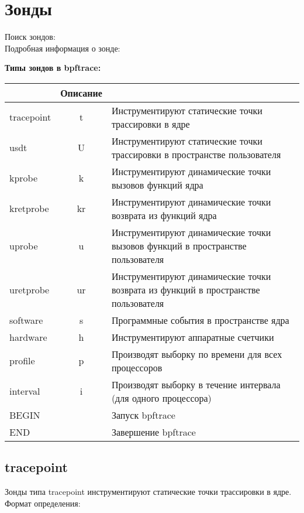 \section{Зонды}

Поиск зондов: \\
Подробная информация о зонде: \\


\textbf{Типы зондов в bpftrace:} \\
\begin{tabular}{|l|c|p{12cm}|}
\hline
\rowcolor{gray!40}
\multicolumn{2}{|c|}{Тип (Псевдоним)} & Описание \\
\hline
tracepoint & t & Инструментируют статические точки трассировки в ядре  \\
\hline
usdt & U & Инструментируют статические точки трассировки в пространстве пользователя  \\
\hline
kprobe & k & Инструментируют динамические точки вызовов функций ядра  \\
\hline
kretprobe & kr & Инструментируют динамические точки возврата из функций ядра  \\
\hline
uprobe & u & Инструментируют динамические точки вызовов функций в пространстве пользователя  \\
\hline
uretprobe & ur & Инструментируют динамические точки возврата из функций в пространстве пользователя  \\
\hline
software & s & Программные события в пространстве ядра  \\
\hline
hardware & h & Инструментируют аппаратные счетчики  \\
\hline
profile & p & Производят выборку по времени для всех процессоров  \\
\hline
interval & i & Производят выборку в течение интервала (для одного процессора)  \\
\hline
BEGIN & & Запуск bpftrace  \\
\hline
END & & Завершение bpftrace  \\
\hline
\end{tabular}

\subsection{tracepoint}
Зонды типа tracepoint инструментируют статические точки трассировки в ядре.
Формат определения: \\

